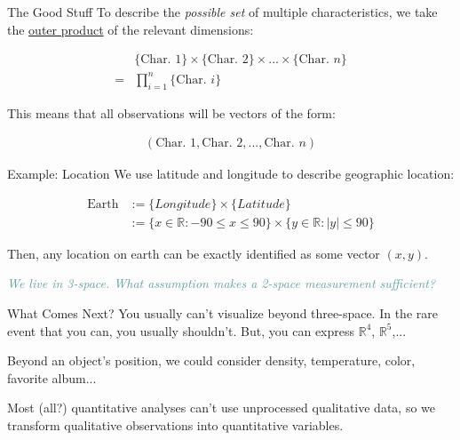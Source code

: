 \documentclass[10pt]{beamer}
\begin{document}
\begin{frame}{The Good Stuff}
    To describe the \emph{possible set} of multiple characteristics, we take the \underline{outer product} of the relevant dimensions:
    
    \begin{align*}
        &\{\text{Char. }1\} \times \{\text{Char. }2\} \times ... \times \{\text{Char. }n\} \\
        = & \prod_{i = 1}^{n}\{\text{Char. }i\}
    \end{align*}

    This means that all observations will be vectors of the form:  

    \begin{align*}
        (\text{Char. }1, \text{Char. }2, ..., \text{Char. }n)
    \end{align*}
\end{frame}

\begin{frame}{Example: Location}
    We use latitude and longitude to describe geographic location:

    \begin{align*}
        \text{Earth} &:=  \{Longitude\} \times \{Latitude\} \\
        &:= \{x \in \mathbb{R}: -90 \leq x \leq 90\} \times \{y \in \mathbb{R}: |y| \leq 90\}
    \end{align*}

    Then, any location on earth can be exactly identified as some vector $(x,y)$.  \\
    \pause

    \emph{\textcolor{CadetBlue}{We live in 3-space. What assumption makes a 2-space measurement sufficient?}}
\end{frame}

\begin{frame}{What Comes Next?}
    You usually can't visualize beyond three-space. In the rare event that you can, you usually shouldn't. But, you can express $\mathbb{R}^4$, $\mathbb{R}^5$,...

\vspace{.3cm}
    Beyond an object's position, we could consider density, temperature, color, favorite album...
\vspace{.3cm}

    Most (all?) quantitative analyses can't use unprocessed qualitative data, so we transform qualitative observations into quantitative variables.
\end{frame}
\end{document}
